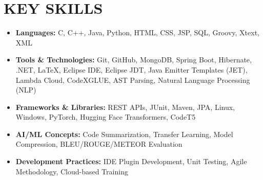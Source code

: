 \section{KEY SKILLS}
{\begin{itemize}
  \item \textbf{Languages:} C, C++, Java, Python, HTML, CSS, JSP, SQL, Groovy, Xtext, XML
  \vspace{0.3em}
  \item \textbf{Tools \& Technologies:} Git, GitHub, MongoDB, Spring Boot, Hibernate, .NET, LaTeX, Eclipse IDE, Eclipse JDT, Java Emitter Templates (JET), Lambda Cloud, CodeXGLUE, AST Parsing, Natural Language Processing (NLP)
  \vspace{0.3em}
  \item \textbf{Frameworks \& Libraries:} REST APIs, JUnit, Maven, JPA, Linux, Windows, PyTorch, Hugging Face Transformers, CodeT5
  \vspace{0.3em}
  \item \textbf{AI/ML Concepts:} Code Summarization, Transfer Learning, Model Compression, BLEU/ROUGE/METEOR Evaluation
  \vspace{0.3em}
  \item \textbf{Development Practices:} IDE Plugin Development, Unit Testing, Agile Methodology, Cloud-based Training
  \vspace{0.3em}
\end{itemize}
}
